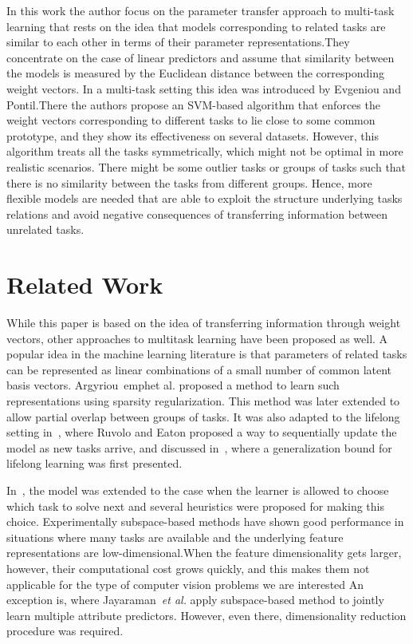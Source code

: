 \documentclass[10pt,twocolumn,letterpaper]{article}
\begin{document}
In this work the author focus on the parameter transfer approach to multi-task learning that rests on the idea that models corresponding to related tasks are similar to each other in terms of their parameter representations.They concentrate on the case of linear predictors and assume that similarity between the models is measured by the Euclidean distance between the corresponding weight vectors. In a multi-task setting this idea was introduced by Evgeniou and Pontil.There the authors propose an SVM-based algorithm that enforces the weight vectors corresponding to different tasks to lie close to some common prototype, and they show its effectiveness on several datasets. However, this algorithm treats all the tasks symmetrically, which might not be optimal in more realistic scenarios. There might be some outlier tasks or groups of tasks such that there is no similarity between the tasks from different groups. Hence, more flexible models are needed that are able to exploit the structure underlying tasks relations and avoid negative consequences of transferring information between unrelated tasks.
\section{Related Work}
While this paper is based on the idea of transferring information through weight vectors, other approaches to multitask learning have been proposed as well. A popular idea in the machine learning literature is that parameters of related tasks can be represented as linear combinations of a small number of common latent basis vectors. Argyriou~emph{et al.} proposed a method to learn such representations using sparsity regularization. This method was later extended to allow partial overlap between groups of tasks. It was also adapted to the lifelong setting in~\cite{Ruvolo2013ELLA}, where Ruvolo and Eaton proposed a way to sequentially update the model as new tasks arrive, and discussed in~\cite{Pentina2014A}, where a generalization bound for lifelong learning was first presented.

In~\cite{Ruvolo2013Active}, the model was extended to the case when the learner is allowed to choose which task to solve next and several heuristics were proposed for making this choice. Experimentally subspace-based methods have shown good performance in situations where many tasks are available and the underlying feature representations are low-dimensional.When the feature dimensionality gets larger, however, their computational cost grows quickly, and this makes them not
applicable for the type of computer vision problems we are interested An exception is\cite{Jayaraman2014Decorrelating}, where Jayaraman~\emph{et al.} apply subspace-based method to jointly learn multiple attribute predictors. However, even there, dimensionality reduction procedure was required.
\end{document}

